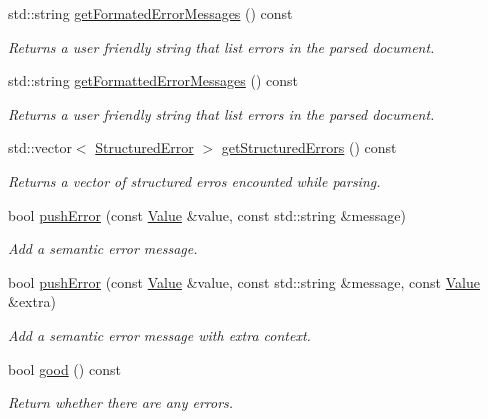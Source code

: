 \begin{DoxyCompactItemize}
std\-::string \hyperlink{class_json_1_1_reader_afa4a59e962d23c4d1c38b433fc95eefa}{get\-Formated\-Error\-Messages} () const 
\begin{DoxyCompactList}\small\item\em Returns a user friendly string that list errors in the parsed document. \end{DoxyCompactList}\item 
std\-::string \hyperlink{class_json_1_1_reader_a95ab50aa789132e9dee0fc1475c85acf}{get\-Formatted\-Error\-Messages} () const 
\begin{DoxyCompactList}\small\item\em Returns a user friendly string that list errors in the parsed document. \end{DoxyCompactList}\item 
std\-::vector$<$ \hyperlink{struct_json_1_1_reader_1_1_structured_error}{Structured\-Error} $>$ \hyperlink{class_json_1_1_reader_a08c2ea5ffc7d2a9c9e35020835624f0b}{get\-Structured\-Errors} () const 
\begin{DoxyCompactList}\small\item\em Returns a vector of structured erros encounted while parsing. \end{DoxyCompactList}\item 
bool \hyperlink{class_json_1_1_reader_ade6c28e0ef00d8f2e0aa2283f91c3e37}{push\-Error} (const \hyperlink{class_json_1_1_value}{Value} \&value, const std\-::string \&message)
\begin{DoxyCompactList}\small\item\em Add a semantic error message. \end{DoxyCompactList}\item 
bool \hyperlink{class_json_1_1_reader_a9b474233c3a7c688e340e70665d45223}{push\-Error} (const \hyperlink{class_json_1_1_value}{Value} \&value, const std\-::string \&message, const \hyperlink{class_json_1_1_value}{Value} \&extra)
\begin{DoxyCompactList}\small\item\em Add a semantic error message with extra context. \end{DoxyCompactList}\item 
bool \hyperlink{class_json_1_1_reader_a06b52dcc656549506b1ae6f05167ecf4}{good} () const 
\begin{DoxyCompactList}\small\item\em Return whether there are any errors. \end{DoxyCompactList}\end{DoxyCompactItemize}


